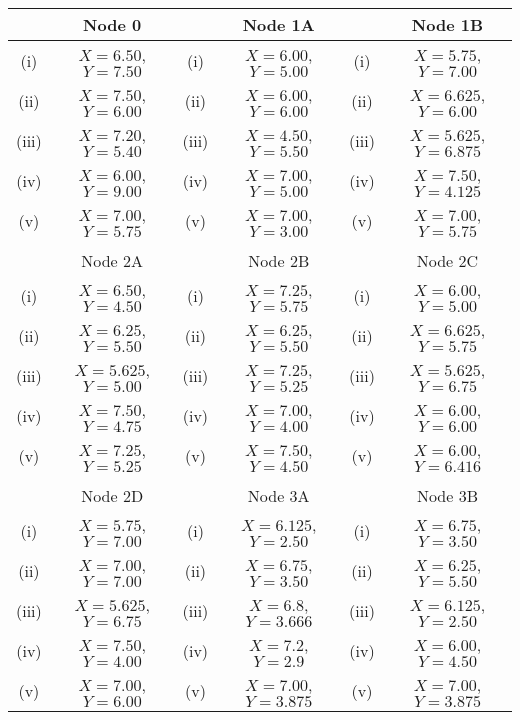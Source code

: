 \documentclass[french]{article}
\begin{document}
	\begin{tabular}{||c|c||c|c||c|c||}
		\hline  & Node 0 &   & Node 1A &  & Node 1B     \\  \hline
		\hline (i) & $X= 6.50$, $Y= 7.50$ & (i) & $X= 6.00$, $Y= 5.00$ &  (i)  & $X= 5.75$, $Y = 7.00$\\  \hline
		\hline (ii)  & $X= 7.50$, $Y= 6.00$  &  (ii) & $X= 6.00$, $Y= 6.00$ & (ii) & $X= 6.625$, $Y = 6.00 $ \\  \hline
		\hline (iii) & $X= 7.20$, $Y = 5.40$  & (iii) & $X= 4.50$, $Y = 5.50$ & (iii) & $X= 5.625$, $Y = 6.875$ \\  \hline
		\hline (iv)  & $X= 6.00$, $Y =9.00 $  &  (iv) & $X= 7.00$, $Y = 5.00 $ & (iv)  & $X= 7.50$, $Y= 4.125$\\  \hline
		\hline (v) & $X= 7.00$, $Y= 5.75$ & (v)  & $X= 7.00$, $Y= 3.00$ & (v) & $X= 7.00$, $Y= 5.75$\\  \hline & & & & & \\
		\hline 
		\hline  & Node 2A &   & Node 2B &  & Node 2C  \\  \hline
		\hline (i) & $X= 6.50$, $Y= 4.50$ & (i)  & $X= 7.25 $, $Y = 5.75 $  & (i)  & $X= 6.00$, $Y = 5.00$\\  \hline
		\hline (ii)  & $X= 6.25$, $Y= 5.50$  &  (ii) &$X= 6.25$, $Y= 5.50$ & (ii) & $X= 6.625$, $Y = 5.75 $ \\  \hline
		\hline (iii) & $X= 5.625  $, $Y = 5.00 $  &  (iii) &$X= 7.25 $, $Y = 5.25 $ &  (iii) & $X= 5.625$, $Y = 6.75$ \\  \hline
		\hline (iv)  & $X= 7.50$, $Y = 4.75 $  & (iv) & $X= 7.00 $, $Y = 4.00 $ & (iv)  & $X= 6.00$, $Y = 6.00$\\  \hline
		\hline (v) & $X= 7.25 $, $Y = 5.25 $ & (v) & $X= 7.50$, $Y= 4.50$  &(v) & $X= 6.00$, $Y= 6.416$\\  \hline & & & & & \\
		\hline 
		\hline  & Node 2D &   & Node 3A &  & Node 3B   \\  \hline
		\hline (i) & $X= 5.75$, $Y= 7.00$ &  (i) & $X= 6.125$, $Y= 2.50$  & (i)  & $X= 6.75$, $Y= 3.50$\\  \hline
		\hline (ii)  & $X= 7.00$, $Y = 7.00$  &  (ii) & $X= 6.75$, $Y= 3.50$ & (ii) & $X= 6.25$, $Y= 5.50$ \\  \hline
		\hline (iii) & $X= 5.625$, $Y= 6.75$  & (iii) & $X= 6.8$, $Y =3.666 $ &(iii) & $X= 6.125$, $Y= 2.50$ \\  \hline
		\hline (iv)  & $X= 7.50$, $Y= 4.00$  & (iv) & $X= 7.2$, $Y = 2.9$ & (iv)  & $X= 6.00$, $Y= 4.50$\\  \hline
		\hline (v) & $X= 7.00$, $Y= 6.00$ & (v) & $X= 7.00$, $Y= 3.875$  &(v) & $X= 7.00$, $Y= 3.875$\\  \hline%
	\end{tabular} 
\end{document}

